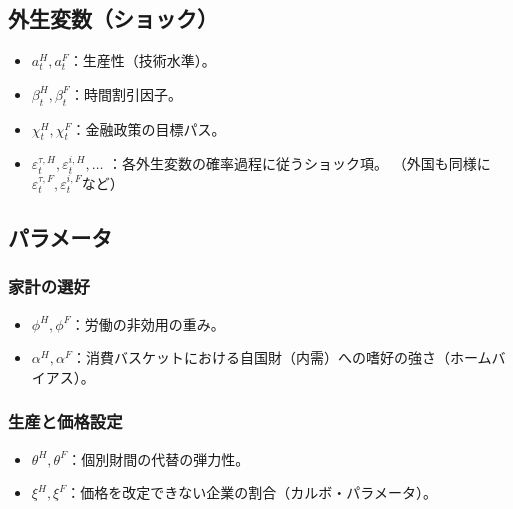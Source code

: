 \subsection*{外生変数（ショック）}
\label{sec:model_variables_exogenous}
\begin{itemize}
    \item
    \label{itm:model_variables_exogenous_a}
        \(a_t^H,a_t^F\)：生産性（技術水準）。
    \item
    \label{itm:model_variables_exogenous_beta}
        \(\beta_t^H,\beta_t^F\)：時間割引因子。
    \item
    \label{itm:model_variables_exogenous_chi}
        \(\chi_t^H,\chi_t^F\)：金融政策の目標パス。
    \item
    \label{itm:model_variables_exogenous_eps}
        \(\varepsilon_t^{\tau,H},\varepsilon_t^{i,H},\dots\)
        ：各外生変数の確率過程に従うショック項。
        （外国も同様に\(\varepsilon_t^{\tau,F},\varepsilon_t^{i,F}\)など）
\end{itemize}

\subsection*{パラメータ}
\label{sec:model_variables_parameters}

\subsubsection*{家計の選好}
\label{sec:model_variables_parameters_preferences}
\begin{itemize}
    \item
    \label{itm:model_variables_parameters_preferences_phi}
        \(\phi^H,\phi^F\)：労働の非効用の重み。
    \item
    \label{itm:model_variables_parameters_preferences_alpha}
        \(\alpha^H,\alpha^F\)：消費バスケットにおける自国財（内需）への嗜好の強さ（ホームバイアス）。
\end{itemize}

\subsubsection*{生産と価格設定}
\label{sec:model_variables_parameters_production}
\begin{itemize}
    \item
    \label{itm:model_variables_parameters_production_theta}
        \(\theta^H,\theta^F\)：個別財間の代替の弾力性。
    \item
    \label{itm:model_variables_parameters_production_xi}
        \(\xi^H,\xi^F\)：価格を改定できない企業の割合（カルボ・パラメータ）。
\end{itemize}

